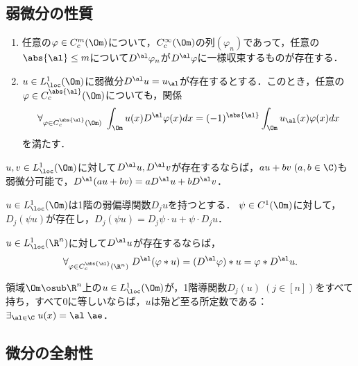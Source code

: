 \documentclass[uplatex,dvipdfmx]{jsreport}
\begin{document}
\subsection{弱微分の性質}

\begin{proposition}\mbox{}
    \begin{enumerate}
        \item 任意の$\varphi\in C_c^m(\Om)$について，$C_c^\infty(\Om)$の列$(\varphi_n)$であって，任意の$\abs{\al}\le m$について$D^\al\varphi_n$が$D^\al\varphi$に一様収束するものが存在する．
        \item $u\in L^1_\loc(\Om)$に弱微分$D^\al u=u_\al$が存在するとする．このとき，任意の$\varphi\in C^{\abs{\al}}_c(\Om)$についても，関係
        \[\forall_{\varphi\in C_c^{\abs{\al}}(\Om)}\;\int_\Om u(x)D^\al\varphi(x)dx=(-1)^{\abs{\al}}\int_\Om u_\al(x)\varphi(x)dx\]
        を満たす．
    \end{enumerate}
\end{proposition}

\begin{proposition}[線型作用素]
    $u,v\in L^1_\loc(\Om)$に対して$D^\al u,D^\al v$が存在するならば，$au+bv\;(a,b\in\C)$も弱微分可能で，$D^\al(au+bv)=aD^\al u+bD^\al v$．
\end{proposition}

\begin{theorem}[Leibniz則]
    $u\in L^1_\loc(\Om)$は1階の弱偏導関数$D_ju$を持つとする．
    $\psi\in C^1(\Om)$に対して，$D_j(\psi u)$が存在し，$D_j(\psi u)=D_j\psi\cdot u+\psi\cdot D_ju$．
\end{theorem}

\begin{proposition}[畳み込みとの可換性]
    $u\in L^1_\loc(\R^n)$に対して$D^\al u$が存在するならば，
    \[\forall_{\varphi\in C_c^{\abs{\al}}(\R^n)}\;D^\al(\varphi *u)=(D^\al\varphi)*u=\varphi *D^\al u.\]
\end{proposition}

\begin{proposition}
    領域$\Om\osub\R^n$上の$u\in L^1_\loc(\Om)$が，1階導関数$D_j(u)\;(j\in[n])$をすべて持ち，すべて$0$に等しいならば，$u$は殆ど至る所定数である：$\exists_{\al\in\C}\;u(x)=\al\;\ae$．
\end{proposition}

\subsection{微分の全射性}
\end{document}
